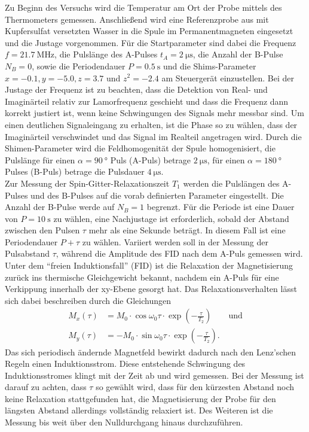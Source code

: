 \noindent Zu Beginn des Versuchs wird die Temperatur am Ort der Probe mittels
des Thermometers gemessen. Anschließend wird eine Referenzprobe aus mit
Kupfersulfat versetzten Wasser in die Spule im Permanentmagneten eingesetzt und
die Justage vorgenommen. Für die Startparameter sind dabei die Frequenz $f =
\SI{21.7}{\mega\hertz}$, die Pulslänge des A-Pulses $t_A =
\SI{2}{\micro\second}$, die Anzahl der B-Pulse $N_B = 0$, sowie die Periodendauer
$P = \SI{0.5}{\second}$ und die Shims-Parameter $x = -0.1, y = -5.0, z = 3.7$
und $z^2 = -2.4$ am Steuergerät einzustellen. Bei der Justage der Frequenz ist
zu beachten, dass die Detektion von Real- und Imaginärteil relativ zur
Lamorfrequenz geschieht und dass die Frequenz dann korrekt justiert ist, wenn
keine Schwingungen des Signals mehr messbar sind. Um einen deutlichen
Signaleingang zu erhalten, ist die Phase so zu wählen, dass der Imaginärteil
verschwindet und das Signal im Realteil angetragen wird. Durch die
Shimen-Parameter wird die Feldhomogenität der Spule homogenisiert, die Pulslänge
für einen $\alpha = \SI{90}{\degree}$ Puls (A-Puls) betrage
$\SI{2}{\micro\second}$, für einen $\alpha = \SI{180}{\degree}$ Pulses (B-Puls)
betrage die Pulsdauer $\SI{4}{\micro\second}$. \\
Zur Messung der Spin-Gitter-Relaxationszeit $T_1$ werden die Pulslängen des
A-Pulses und des B-Pulses auf die vorab definierten Parameter eingestellt.
Die Anzahl der B-Pulse werde auf $N_B = 1$ begrenzt. Für die Periode ist eine
Dauer von $P = \SI{10}{\second}$ zu wählen, eine Nachjustage ist erforderlich,
sobald der Abstand zwischen den Pulsen $\tau$ mehr als eine Sekunde beträgt. In
diesem Fall ist eine Periodendauer $P + \tau$ zu wählen. Variiert werden soll in
der Messung der Pulsabstand $\tau$, während die Amplitude des FID nach dem
A-Puls gemessen wird. \\
\noindent Unter dem \enquote{freien Induktionsfall} (FID) ist die Relaxation
der Magnetisierung zurück ins thermische Gleichgewicht bekannt, nachdem ein
A-Puls für eine Verkippung innerhalb der xy-Ebene gesorgt hat. Das
Relaxationsverhalten lässt sich dabei beschreiben durch die Gleichungen
\begin{align}
  M_x(\tau) &= M_0 \cdot \cos{\omega_0 \tau} \cdot \exp{\left( - \frac{\tau}{T_2}\right)} \qquad \text{und} \\
  M_y(\tau) &= - M_0 \cdot \sin{\omega_0 \tau} \cdot \exp{\left( - \frac{\tau}{T_2}\right)}.
\end{align}
\noindent Das sich periodisch ändernde Magnetfeld bewirkt dadurch nach den
Lenz'schen Regeln einen Induktionsstrom. Diese entstehende Schwingung des
Induktionsstromes klingt mit der Zeit ab und wird gemessen. Bei der Messung ist
darauf zu achten, dass $\tau$ so gewählt wird, dass für den kürzesten Abstand
noch keine Relaxation stattgefunden hat, die Magnetisierung der Probe für den
längsten Abstand allerdings vollständig relaxiert ist. Des Weiteren ist die
Messung bis weit über den Nulldurchgang hinaus durchzuführen. 
